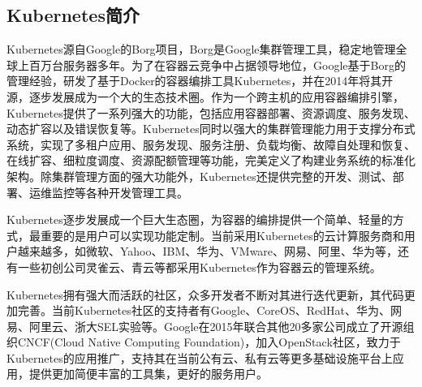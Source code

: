 \subsection{Kubernetes简介}
Kubernetes源自Google的Borg项目，Borg是Google集群管理工具，稳定地管理全球上百万台服务器多年。为了在容器云竞争中占据领导地位，Google基于Borg的管理经验，研发了基于Docker的容器编排工具Kubernetes，并在2014年将其开源，逐步发展成为一个大的生态技术圈。作为一个跨主机的应用容器编排引擎，Kubernetes提供了一系列强大的功能，包括应用容器部署、资源调度、服务发现、动态扩容以及错误恢复等。Kubernetes同时以强大的集群管理能力用于支撑分布式系统，实现了多租户应用、服务发现、服务注册、负载均衡、故障自处理和恢复、在线扩容、细粒度调度、资源配额管理等功能，完美定义了构建业务系统的标准化架构。除集群管理方面的强大功能外，Kubernetes还提供完整的开发、测试、部署、运维监控等各种开发管理工具。

Kubernetes逐步发展成一个巨大生态圈，为容器的编排提供一个简单、轻量的方式，最重要的是用户可以实现功能定制。当前采用Kubernetes的云计算服务商和用户越来越多，如微软、Yahoo、IBM、华为、VMware、网易、阿里、华为等，还有一些初创公司灵雀云、青云等都采用Kubernetes作为容器云的管理系统。

Kubernetes拥有强大而活跃的社区，众多开发者不断对其进行迭代更新，其代码更加完善。当前Kubernetes社区的支持者有Google、CoreOS、RedHat、华为、网易、阿里云、浙大SEL实验等。Google在2015年联合其他20多家公司成立了开源组织CNCF(Cloud Native Computing Foundation)，加入OpenStack社区，致力于Kubernetes的应用推广，支持其在当前公有云、私有云等更多基础设施平台上应用，提供更加简便丰富的工具集，更好的服务用户。

